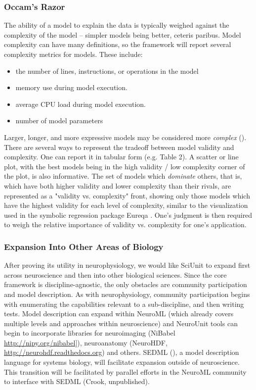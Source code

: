 \documentclass[a4paper,12pt]{article}
\begin{document}
\subsubsection{Occam's Razor}
The ability of a model to explain the data is typically weighed against the complexity of the model -- simpler models being better, ceteris paribus.  Model complexity can have many definitions, so the framework will report several complexity metrics for models.  These include:
\begin{itemize}
\item the number of lines, instructions, or operations in the model
\item memory use during model execution.  
\item average CPU load during model execution.  
\item number of model parameters
\end{itemize}
Larger, longer, and more expressive models may be considered more \textit{complex} (\cite{McCabe1976}).  There are several ways to represent the tradeoff between model validity and complexity.  One can report it in tabular form (e.g. Table 2).  A scatter or line plot, with the best models being in the high validity / low complexity corner of the plot, is also informative.  The set of models which \textit{dominate} others, that is, which have both higher validity and lower complexity than their rivals, are represented as a "validity vs. complexity" front, showing only those models which have the highest validity for each level of complexity, similar to the visualization used in the symbolic regression package Eureqa \cite{schmidt2009}.  One's judgment is then required to weigh the relative importance of validity vs. complexity for one's application.  

\subsubsection{Expansion Into Other Areas of Biology}
After proving its utility in neurophysiology, we would like SciUnit to expand first across neuroscience and then into other biological sciences.  Since the core framework is discipline-agnostic, the only obstacles are community participation and model description.  As with neurophysiology, community participation begins with enumerating the capabilities relevant to a sub-discipline, and then writing tests.  Model description can expand within NeuroML (which already covers multiple levels and approaches within neuroscience) and NeuroUnit tools can begin to incorporate libraries for neuroimaging (NiBabel \url{http://nipy.org/nibabel}]), neuroanatomy (NeuroHDF, \url{http://neurohdf.readthedocs.org}) and others.  SEDML (\cite{hucka2003}), a model description language for systems biology, will facilitate expansion outside of neuroscience.  This transition will be facilitated by parallel efforts in the NeuroML community to interface with SEDML (Crook, unpublished).  
\end{document}
